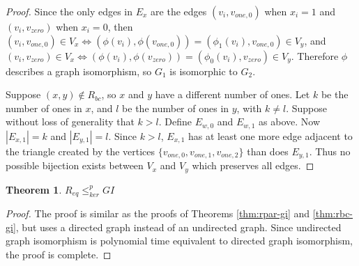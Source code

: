\documentclass{article}
\newtheorem{theorem}{Theorem}[section]
\theoremstyle{definition}
\newcommand{\kr}{\leq^{p}_{ker}}
\begin{document}
\begin{proof}
  Since the only edges in $E_x$ are the edges $(v_i, v_{one,0})$ when $x_i=1$
  and $(v_i, v_{zero})$ when $x_i=0$, then $(v_i, v_{one,0})\in V_x
  \iff (\phi(v_i), \phi(v_{one,0}))=(\phi_1(v_i), v_{one,0})\in
  V_y$, and $(v_i, v_{zero})\in V_x \iff (\phi(v_i), \phi(v_{zero}))
  = (\phi_0(v_i), v_{zero})\in V_y$. Therefore $\phi$ describes a graph
  isomorphism, so $G_1$ is isomorphic to $G_2$.
  
  Suppose $(x,y)\notin R_{bc}$, so $x$ and $y$ have a different number of
  ones. Let $k$ be the number of ones in $x$, and $l$ be the number of ones in
  $y$, with $k\neq l$. Suppose without loss of generality that $k>l$. Define
  $E_{w,0}$ and $E_{w,1}$ as above. Now $|E_{x,1}|=k$ and $|E_{y,1}|=l$. Since
  $k>l$, $E_{x,1}$ has at least one more edge adjacent to the triangle created
  by the vertices $\{v_{one,0},v_{one,1},v_{one,2}\}$ than does $E_{y,1}$. Thus
  no possible bijection exists between $V_x$ and $V_y$ which preserves all
  edges.
\end{proof}

\begin{theorem}$R_{eq} \kr GI$\end{theorem}
\begin{proof}The proof is similar as the proofs of Theorems \ref{thm:rpar-gi}
  and \ref{thm:rbc-gi}, but uses a directed graph instead of an undirected
  graph. Since undirected graph isomorphism is polynomial time equivalent to
  directed graph isomorphism, the proof is complete.\end{proof}
\end{document}
